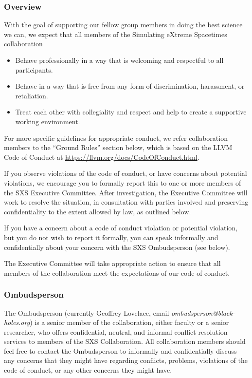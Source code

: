 \subsubsection{Overview} 
With the goal of supporting our fellow group members in doing the best
science we can, we expect that all members of the Simulating eXtreme
Spacetimes collaboration
\begin{itemize} 
\item Behave professionally in a way that is welcoming and respectful
  to all participants.
\item Behave in a way that is free from any form of discrimination,
  harassment, or retaliation.
\item Treat each other with collegiality and respect and help to
  create a supportive working environment.
\end{itemize}
For more specific guidelines for appropriate conduct, we refer
collaboration members to the “Ground Rules” section below, which is
based on the LLVM Code of Conduct at
\url{https://llvm.org/docs/CodeOfConduct.html}.

If you observe violations of the code of conduct, or have concerns about
potential violations, we encourage you to formally report this to one or more
members of the SXS Executive Committee. After investigation, the Executive
Committee will work to resolve the situation, in consultation with parties
involved and preserving confidentiality to the extent allowed by law, as
outlined below. 

If you have a concern about a code of conduct violation or potential
violation, but you do not wish to report it formally, you can speak
informally and confidentially about your concern with the SXS
Ombudsperson (see below).

The Executive Committee will take appropriate action to ensure that
all members of the collaboration meet the expectations of our code of
conduct.

\subsubsection{Ombudsperson}
\label{sec:ombudsperson}
The Ombudsperson (currently Geoffrey Lovelace, email
\emph{ombudsperson@black-holes.org}) is a senior member of the collaboration, 
either faculty or a senior researcher, who offers confidential, neutral, and
informal conflict resolution services to members of the SXS
Collaboration. All collaboration members should feel free to contact
the Ombudsperson to informally and confidentially discuss any concerns
that they might have regarding conflicts, problems, violations of the
code of conduct, or any other concerns they might have.

